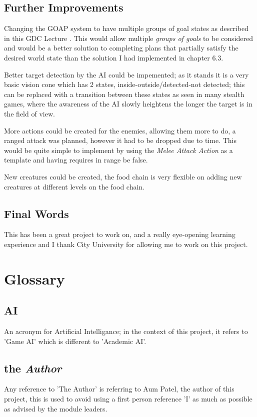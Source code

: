 \documentclass[11pt]{report}
\begin{document}
\section{Further Improvements}
Changing the GOAP system to have multiple groups of goal states as described in this GDC Lecture \cite{10goap}. This would allow multiple \textit{groups of goals} to be considered and would be a better solution to completing plans that partially satisfy the desired world state than the solution I had implemented in chapter 6.3.

Better target detection by the AI could be impemented; as it stands it is a very basic vision cone which has 2 states, inside-outside/detected-not detected; this can be replaced with a transition between these states as seen in many stealth games, where the awareness of the AI slowly heightens the longer the target is in the field of view. 

More actions could be created for the enemies, allowing them more to do, a ranged attack was planned, however it had to be dropped due to time. This would be quite simple to implement by using the \textit{Melee Attack Action} as a template and having requires in range be false.

New creatures could be created, the food chain is very flexible on adding new creatures at different levels on the food chain.

\section{Final Words}

This has been a great project to work on, and a really eye-opening learning experience and I thank City University for allowing me to work on this project.

\chapter{Glossary}
\section{AI}
An acronym for Artificial Intelligance; in the context of this project, it refers to 'Game AI' which is different to 'Academic AI'.

\section{the \textit{Author}}
Any reference to 'The Author' is referring to Aum Patel, the author of this project, this is used to avoid using a first person reference 'I' as much as possible as advised by the module leaders.
\end{document}
